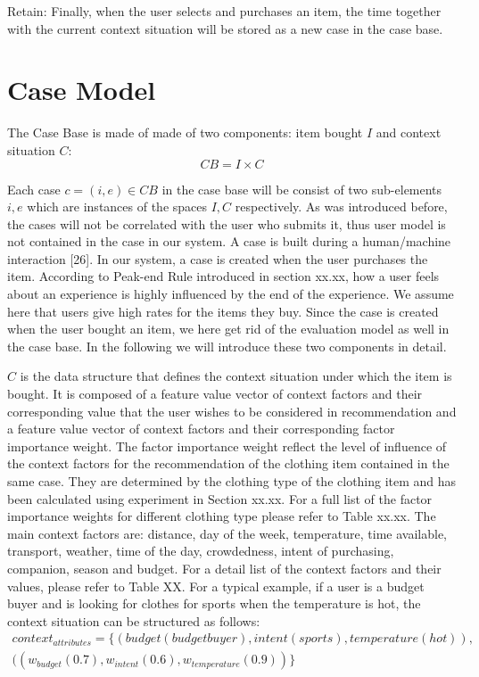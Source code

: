 Retain: Finally, when the user selects and purchases an item, the time together with the current context situation will be stored as a new case in the case base.

\section{Case Model} \label{sec:cm}

The Case Base is made of made of two components: item bought $I$ and context situation $C$: 
\begin{equation} \label{eq:caseMode}
CB = I \times C
\end{equation}

Each case $c=(i,e) \in CB$ in the case base will be consist of two sub-elements $i,e$ which are instances of the spaces $I,C$ respectively. As was introduced before, the cases will not be correlated with the user who submits it, thus user model is not contained in the case in our system. A case is built during a human/machine interaction [26]. In our system, a case is created when the user purchases the item. According to Peak-end Rule introduced in section xx.xx, how a user feels about an experience is highly influenced by the end of the experience. We assume here that users give high rates for the items they buy.  Since the case is created when the user bought an item, we here get rid of the evaluation model as well in the case base. In the following we will introduce these two components in detail. 

$C$ is the data structure that defines the context situation under which the item is bought. It is composed of a feature value vector of context factors and their corresponding value that the user wishes to be considered in recommendation and a feature value vector of context factors and their corresponding factor importance weight. The factor importance weight reflect the level of influence of the context factors for the recommendation of the clothing item contained in the same case. They are determined by the clothing type of the clothing item and has been calculated using experiment in Section xx.xx. For a full list of the factor importance weights for different clothing type please refer to Table xx.xx. The main context factors are: distance, day of the week, temperature, time available, transport, weather, time of the day, crowdedness, intent of purchasing, companion, season and budget. For a detail list of the context factors and their values, please refer to Table XX. For a typical example, if a user is a budget buyer and is looking for clothes for sports when the temperature is hot, the context situation can be structured as follows:
\begin{equation} \label{eq:context}
\begin{split}
	{context}_{attributes} = \{(budget (budget buyer), intent (sports), temperature (hot)), &\\
	                                            ((w_{budget}(0.7), w_{intent}(0.6), w_{temperature}(0.9))\} &
\end{split}
\end{equation}


